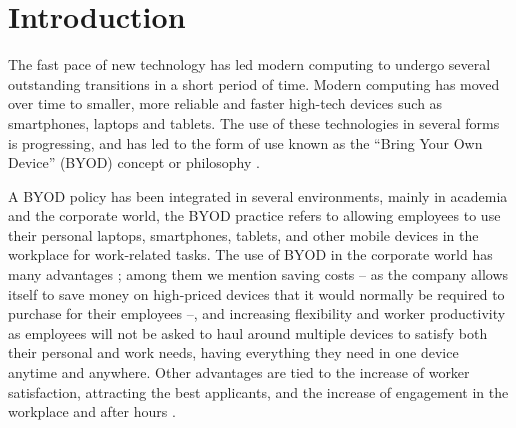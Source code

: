 \documentclass[a4paper,10pt,twocolumn,preprint,3p]{elsarticle}
\begin{document}
\section{Introduction}
\label{sec:intro}
The fast pace of new technology has led modern computing to undergo
several outstanding transitions in a short period of time. Modern computing has moved over time to smaller, more reliable and faster high-tech devices such as smartphones, laptops and tablets. The use of these technologies in several forms is progressing, and has led to the form of use known as the ``Bring Your Own Device'' (BYOD) concept or philosophy \cite{ballagas2004byod}. %

A BYOD policy has been integrated in several environments, mainly in %
academia and the corporate world, the BYOD
practice refers to allowing employees to use their
personal laptops, smartphones, tablets, and other mobile devices in
the workplace for work-related tasks. The use of BYOD in the corporate world has many
advantages \cite{singh2012byod}; among them we mention saving costs --
as the company allows itself to save money on high-priced devices that
it would normally be required to purchase for their employees --, and
increasing flexibility and worker productivity as employees will not
be asked to haul around multiple devices to satisfy both their personal and
work needs, having everything they need in one device anytime and
anywhere. 
Other advantages are tied to the increase of worker satisfaction,  attracting the best applicants, and the increase of engagement in the workplace and after hours \cite{singh2012byod}. %
\end{document}
